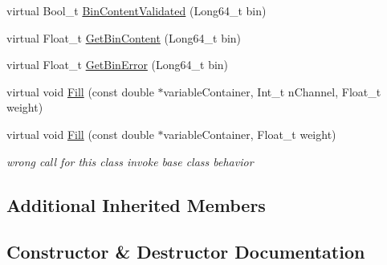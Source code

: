 \begin{DoxyCompactItemize}
virtual Bool\+\_\+t \mbox{\hyperlink{classQn_1_1CorrectionProfileChannelized_a1a7640ed888a3357d28f3f0f8e8b4bec}{Bin\+Content\+Validated}} (Long64\+\_\+t bin)
\item 
virtual Float\+\_\+t \mbox{\hyperlink{classQn_1_1CorrectionProfileChannelized_a45d475d580d3c5dfe9d139552eab766b}{Get\+Bin\+Content}} (Long64\+\_\+t bin)
\item 
virtual Float\+\_\+t \mbox{\hyperlink{classQn_1_1CorrectionProfileChannelized_a68b390bb4d744453239bca73a1c3ca84}{Get\+Bin\+Error}} (Long64\+\_\+t bin)
\item 
virtual void \mbox{\hyperlink{classQn_1_1CorrectionProfileChannelized_a154acd464664786fc84177964072f55b}{Fill}} (const double $\ast$variable\+Container, Int\+\_\+t n\+Channel, Float\+\_\+t weight)
\item 
\mbox{\label{classQn_1_1CorrectionProfileChannelized_ad063c82996e749fdf54526d3c627249b}} 
virtual void \mbox{\hyperlink{classQn_1_1CorrectionProfileChannelized_ad063c82996e749fdf54526d3c627249b}{Fill}} (const double $\ast$variable\+Container, Float\+\_\+t weight)
\begin{DoxyCompactList}\small\item\em wrong call for this class invoke base class behavior \end{DoxyCompactList}\end{DoxyCompactItemize}
\subsection*{Additional Inherited Members}


\subsection{Constructor \& Destructor Documentation}
\mbox{\label{classQn_1_1CorrectionProfileChannelized_ad3860853ae13c35e17017767005cda92}} 
